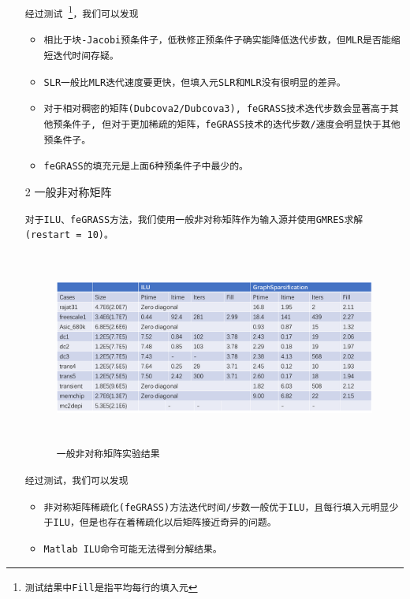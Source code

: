 \documentclass[11pt, a4paper]{article}
\theoremstyle{plain}
\theoremstyle{plain}
\theoremstyle{plain}
\theoremstyle{definition}
\theoremstyle{remark}
\theoremstyle{definition}
\newcommand{\T}[1]{\texttt{#1}}
\begin{document}
\begin{itemize}
	\T{经过测试	\footnote{\T{测试结果中Fill是指平均每行的填入元}}，我们可以发现}
	\begin{itemize}
		\item \T{相比于块-Jacobi预条件子，低秩修正预条件子确实能降低迭代步数，但MLR是否能缩短迭代时间存疑。}
		
		\item \T{SLR一般比MLR迭代速度要更快，但填入元SLR和MLR没有很明显的差异。}
		
		\item \T{对于相对稠密的矩阵(Dubcova2/Dubcova3), feGRASS技术迭代步数会显著高于其他预条件子, 但对于更加稀疏的矩阵，feGRASS技术的迭代步数/速度会明显快于其他预条件子。}
		
		\item \T{feGRASS的填充元是上面6种预条件子中最少的。}
	\end{itemize}
	
	
	
	\item[2] 一般非对称矩阵
	
	\T{对于ILU、feGRASS方法，我们使用一般非对称矩阵作为输入源并使用GMRES求解(restart = 10)。}
	
	\begin{figure}[H]
		\caption{\T{一般非对称矩阵实验结果}}
		\centering
		\includegraphics[width=350pt,height=180pt]{normal.png}
	\end{figure}
	\T{经过测试，我们可以发现}
	\begin{itemize}
		\item \T{非对称矩阵稀疏化(feGRASS)方法迭代时间/步数一般优于ILU，且每行填入元明显少于ILU，但是也存在着稀疏化以后矩阵接近奇异的问题。}
		\item \T{Matlab ILU命令可能无法得到分解结果。}
	\end{itemize}

\end{itemize}
\end{document}
